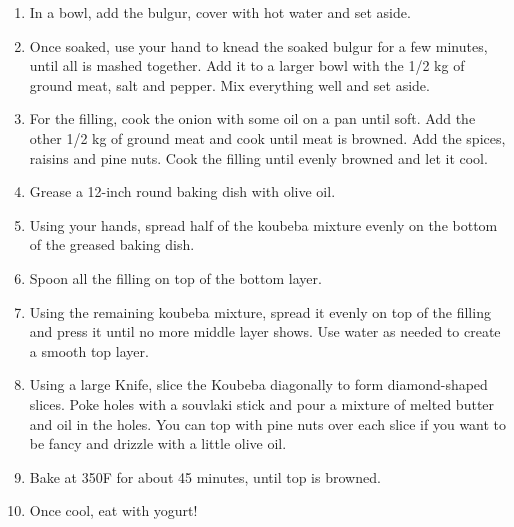\begin{enumerate}
    \item In a bowl, add the bulgur, cover with hot water and set aside.
    \item Once soaked, use your hand to knead the soaked bulgur for a few minutes, until all is mashed together. Add it to a larger bowl with the 1/2 kg of ground meat, salt and pepper. Mix everything well and set aside.
    \item For the filling, cook the onion with some oil on a pan until soft. Add the other 1/2 kg of ground meat and cook until meat is browned. Add the spices, raisins and pine nuts. Cook the filling until evenly browned and let it cool.
    \item Grease a 12-inch round baking dish with olive oil.
    \item Using your hands, spread half of the koubeba mixture evenly on the bottom of the greased baking dish.
    \item Spoon all the filling on top of the bottom layer.
    \item Using the remaining koubeba mixture, spread it evenly on top of the filling and press it until no more middle layer shows. Use water as needed to create a smooth top layer.
    \item Using a large Knife, slice the Koubeba diagonally to form diamond-shaped slices. Poke holes with a souvlaki stick and pour a mixture of melted butter and oil in the holes. You can top with pine nuts over each slice if you want to be fancy and drizzle with a little olive oil.
    \item Bake at 350\degree F for about 45 minutes, until top is browned.
    \item Once cool, eat with yogurt!
\end{enumerate}